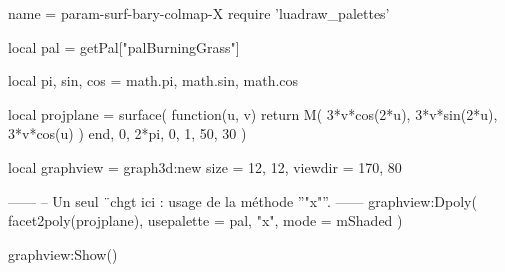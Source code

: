 \documentclass{standalone}
\begin{document}
\begin{luadraw}{name = param-surf-bary-colmap-X}
require 'luadraw_palettes'

local pal = getPal["palBurningGrass"]

local pi, sin, cos = math.pi, math.sin, math.cos

local projplane = surface(
  function(u, v)
    return M(
      3*v*cos(2*u),
      3*v*sin(2*u),
      3*v*cos(u)
    )
  end,
  0, 2*pi, 0, 1,
  {50, 30}
)

local graphview = graph3d:new{
  size    = {12, 12},
  viewdir = {170, 80}
}

------
-- Un seul ¨chgt ici : usage de la méthode ''"x"''.
------
graphview:Dpoly(
  facet2poly(projplane), 
  {
    usepalette = {pal, "x"},
    mode       = mShaded
  }
)

graphview:Show()
\end{luadraw}
\end{document}
